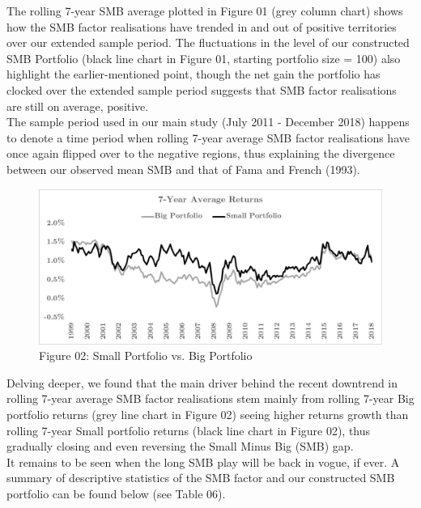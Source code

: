 \documentclass[12pt]{article}
\begin{document}
\newpage

\noindent The rolling 7-year SMB average plotted in Figure 01 (grey column chart) shows how the SMB factor realisations have trended in and out of positive territories over our extended sample period. The fluctuations in the level of our constructed SMB Portfolio (black line chart in Figure 01, starting portfolio size = 100) also highlight the earlier-mentioned point, though the net gain the portfolio has clocked over the extended sample period suggests that SMB factor realisations are still on average, positive. \\

\noindent The sample period used in our main study (July 2011 - December 2018) happens to denote a time period when rolling 7-year average SMB factor realisations have once again flipped over to the negative regions, thus explaining the divergence between our observed mean SMB and that of Fama and French (1993).

\begin{figure}[h]
	\centering
	\includegraphics[width=0.83\linewidth,trim=4 4 4 4,clip]{SMB02}
	\caption*{Figure 02: Small Portfolio vs. Big Portfolio}
	\label{fig:label}
\end{figure}

\noindent Delving deeper, we found that the main driver behind the recent downtrend in rolling 7-year average SMB factor realisations stem mainly from rolling 7-year Big portfolio returns (grey line chart in Figure 02) seeing higher returns growth than rolling 7-year Small portfolio returns (black line chart in Figure 02), thus gradually closing and even reversing the Small Minus Big (SMB) gap.\\

\noindent It remains to be seen when the long SMB play will be back in vogue, if ever. A summary of descriptive statistics of the SMB factor and our constructed SMB portfolio can be found below (see Table 06).

\newpage
\end{document}
